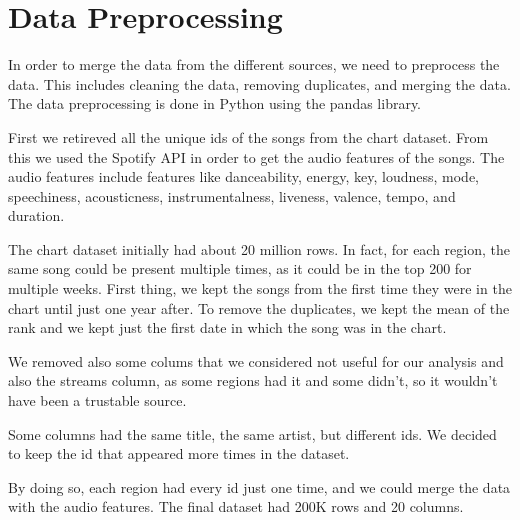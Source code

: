 \chapter{Data Preprocessing}
In order to merge the data from the different sources, we need to preprocess the data. This includes cleaning the data, removing duplicates, and merging the data. The data preprocessing is done in Python using the pandas library. 

First we retireved all the unique ids of the songs from the chart dataset. From this we used the Spotify API in order to get the audio features of the songs. The audio features include features like danceability, energy, key, loudness, mode, speechiness, acousticness, instrumentalness, liveness, valence, tempo, and duration.

The chart dataset initially had about 20 million rows. In fact, for each region, the same song could be present multiple times, as it could be in the top 200 for multiple weeks. First thing, we kept the songs from the first time they were in the chart until just one year after. To remove the duplicates, we kept the mean of the rank and we kept just the first date in which the song was in the chart.

We removed also some colums that we considered not useful for our analysis and also the streams column, as some regions had it and some didn't, so it wouldn't have been a trustable source.

Some columns had the same title, the same artist, but different ids. We decided to keep the id that appeared more times in the dataset.

By doing so, each region had every id just one time, and we could merge the data with the audio features.
The final dataset had 200K rows and 20 columns.